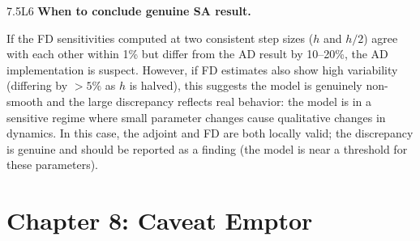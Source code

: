 \begin{solution}{7.5}{L6}
 \textbf{When to conclude genuine SA result.}

If the FD sensitivities computed at two consistent step sizes ($h$ and $h/2$)
agree with each other within 1\% but differ from the AD result by 10--20\%,
the AD implementation is suspect. However, if FD estimates also show
high variability (differing by $>5\%$ as $h$ is halved), this suggests
the model is genuinely non-smooth and the large discrepancy reflects
real behavior: the model is in a sensitive regime where small parameter
changes cause qualitative changes in dynamics. In this case, the adjoint
and FD are both locally valid; the discrepancy is genuine and should
be reported as a finding (the model is near a threshold for these parameters).


\end{solution}


\section{Chapter 8: Caveat Emptor}

